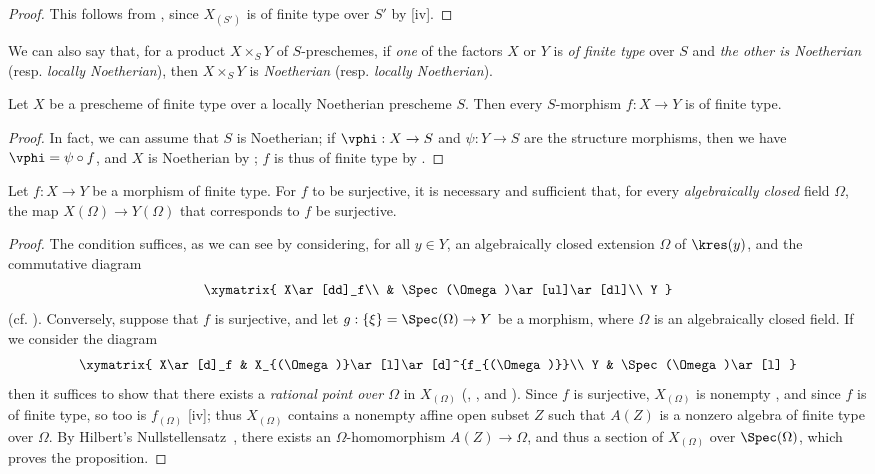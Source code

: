 \begin{proof}
This follows from , since $X_{(S')}$ is of finite type over $S'$ by [iv].
\end{proof}

We can also say that, for a product $X\times_S Y$ of $S$-preschemes, if \emph{one} of the
factors $X$ or $Y$ is \emph{of finite type} over $S$ and \emph{the other is Noetherian} (resp. \emph{locally Noetherian}), then $X\times_S Y$ is \emph{Noetherian} (resp. \emph{locally Noetherian}).

\begin{corollary}[6.3.9]
\label{I.6.3.9}
Let $X$ be a prescheme of finite type over a locally Noetherian prescheme $S$.
Then every $S$-morphism $f:X\to Y$ is of finite type.
\end{corollary}

\begin{proof}
In fact, we can assume that $S$ is Noetherian;
if $\vphi:X\to S$ and $\psi:Y\to S$ are the structure morphisms, then we have $\vphi=\psi\circ f$, and $X$ is Noetherian by ;
$f$ is thus of finite type by .
\end{proof}

\begin{proposition}[6.3.10]
\label{I.6.3.10}
Let $f:X\to Y$ be a morphism of finite type.
For $f$ to be surjective, it is necessary and sufficient that, for every \emph{algebraically closed} field $\Omega$, the map $X(\Omega)\to Y(\Omega)$ that corresponds to $f$  be surjective.
\end{proposition}

\begin{proof}
The condition suffices, as we can see by considering, for all $y\in Y$, an algebraically closed extension $\Omega$ of $\kres(y)$, and the commutative diagram
\[
  \xymatrix{
    X\ar[dd]_f\\
    & \Spec(\Omega)\ar[ul]\ar[dl]\\
    Y
  }
\]
(cf. ).
Conversely, suppose that $f$ is surjective, and let $g:\{\xi\}=\Spec(\Omega)\to Y$ be a morphism, where $\Omega$ is an algebraically closed field.
If we consider the diagram
\[
  \xymatrix{
    X\ar[d]_f &
    X_{(\Omega)}\ar[l]\ar[d]^{f_{(\Omega)}}\\
    Y &
    \Spec(\Omega)\ar[l]
  }
\]
then it suffices to show that there exists a \emph{rational point over $\Omega$} in $X_{(\Omega)}$ (, , and ).
Since $f$ is surjective, $X_{(\Omega)}$ is nonempty , and since $f$ is of finite type, so too is $f_{(\Omega)}$ [iv];
thus $X_{(\Omega)}$ contains a nonempty affine open subset $Z$ such that $A(Z)$ is a nonzero algebra of finite type over $\Omega$.
By Hilbert's Nullstellensatz~\cite{I-21}, there exists an $\Omega$-homomorphism $A(Z)\to\Omega$, and thus a section of $X_{(\Omega)}$ over $\Spec(\Omega)$, which proves the proposition.
\end{proof}

